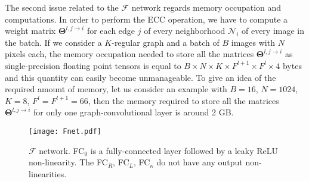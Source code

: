 \documentclass[journal]{IEEEtran}
\newcommand{\fun}{\mathcal{F}}
\newcommand{\Nc}{\mathcal{N}}
\begin{document}
The second issue related to the $\fun$ network regards memory occupation and computations. In order to perform the ECC operation, we have to compute a weight matrix $\bm{\Theta}^{l,j\to i}$ for each edge $j$ of every neighborhood $\Nc_i$ of every image in the batch. If we consider a $K$-regular graph and a batch of $B$ images with $N$ pixels each, the memory occupation needed to store all the matrices $\bm{\Theta}^{l,j\to i}$ as single-precision floating point tensors is equal to $B\times N\times K\times F^{l+1}\times F^l \times 4$ bytes and this quantity can easily become unmanageable. To give an idea of the required amount of memory,  let us consider an example with $B=16$, $N=1024$, $K=8$, $F^l=F^{l+1}=66$, then the memory required to store all the matrices $\bm{\Theta}^{l,j\to i}$ for only one graph-convolutional layer is around 2 GB.

\begin{figure}
    \centering
    \texttt{[image: Fnet.pdf]}
    \caption{$\fun$ network. FC$_0$ is a fully-connected layer followed by a leaky ReLU non-linearity. The FC$_R$, FC$_L$, FC$_\kappa$ do not have any output non-linearities.}
    \label{fig:fnet}
\end{figure}
\end{document}
